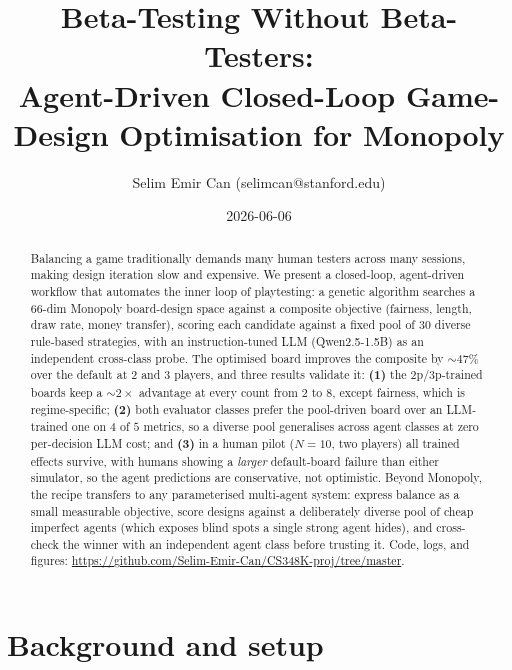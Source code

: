 \documentclass[10pt]{article}
\title{Beta-Testing Without Beta-Testers: \\Agent-Driven
       Closed-Loop Game-Design Optimisation for Monopoly}
\author{Selim Emir Can (selimcan@stanford.edu)}
\date{2026-06-06}
\begin{document}
\maketitle

\begin{abstract}
Balancing a game traditionally demands many human testers across many
sessions, making design iteration slow and expensive. We present a
closed-loop, agent-driven workflow that automates the inner loop of
playtesting: a genetic algorithm searches a 66-dim Monopoly
board-design space against a composite objective (fairness, length,
draw rate, money transfer), scoring each candidate against a fixed
pool of $30$ diverse rule-based strategies, with an instruction-tuned
LLM (Qwen2.5-1.5B) as an independent cross-class probe. The optimised
board improves the composite by ${\sim}47\%$ over the default at 2 and
3 players, and three results validate it: \textbf{(1)} the
2p/3p-trained boards keep a ${\sim}2\times$ advantage at every count
from $2$ to $8$, except fairness, which is regime-specific;
\textbf{(2)} both evaluator classes prefer the pool-driven board over
an LLM-trained one on $4$ of $5$ metrics, so a diverse pool
generalises across agent classes at zero per-decision LLM cost; and
\textbf{(3)} in a human pilot ($N{=}10$, two players) all trained
effects survive, with humans showing a \emph{larger} default-board
failure than either simulator, so the agent predictions are
conservative, not optimistic. Beyond Monopoly, the recipe transfers to
any parameterised multi-agent system: express balance as a small
measurable objective, score designs against a deliberately diverse
pool of cheap imperfect agents (which exposes blind spots a single
strong agent hides), and cross-check the winner with an independent
agent class before trusting it. Code, logs, and figures:
\url{https://github.com/Selim-Emir-Can/CS348K-proj/tree/master}.
\end{abstract}

\section{Background and setup}\label{sec:bg}
\end{document}
